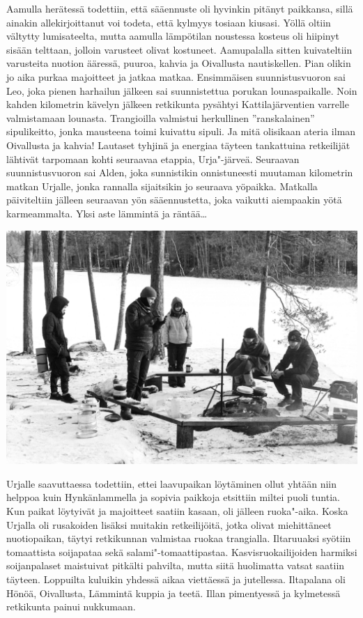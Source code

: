 \begin{multicols}{2}
Aamulla herätessä todettiin, että sääennuste oli hyvinkin pitänyt paikkansa,
sillä ainakin allekirjoittanut voi todeta, että kylmyys tosiaan kiusasi. Yöllä
oltiin vältytty lumisateelta, mutta aamulla lämpötilan noustessa kosteus oli
hiipinyt sisään telttaan, jolloin varusteet olivat kostuneet. Aamupalalla
sitten kuivateltiin varusteita nuotion ääressä, puuroa, kahvia ja Oivallusta
nautiskellen. Pian olikin jo aika purkaa majoitteet ja jatkaa matkaa.
Ensimmäisen suunnistusvuoron sai Leo, joka pienen harhailun jälkeen sai
suunnistettua porukan lounaspaikalle. Noin kahden kilometrin kävelyn jälkeen
retkikunta pysähtyi Kattilajärventien varrelle valmistamaan lounasta.
Trangioilla valmistui herkullinen ''ranskalainen'' sipulikeitto, jonka mausteena
toimi kuivattu sipuli. Ja mitä olisikaan ateria ilman Oivallusta ja kahvia!
Lautaset tyhjinä ja energiaa täyteen tankattuina retkeilijät lähtivät tarpomaan
kohti seuraavaa etappia, Urja"-järveä. Seuraavan suunnistusvuoron sai Alden,
joka sunnistikin onnistuneesti muutaman kilometrin matkan Urjalle, jonka
rannalla sijaitsikin jo seuraava yöpaikka. Matkalla päiviteltiin jälleen
seuraavan yön sääennustetta, joka vaikutti aiempaakin yötä karmeammalta. Yksi
aste lämmintä ja räntää…

\bigskip
\noindent\includegraphics[width=1.0\linewidth,trim={0 0 0 0},clip]{assets/minihaikki6}
\smallskip

Urjalle saavuttaessa todettiin, ettei laavupaikan löytäminen ollut yhtään niin
helppoa kuin Hynkänlammella ja sopivia paikkoja etsittiin miltei puoli tuntia.
Kun paikat löytyivät ja majoitteet saatiin kasaan, oli jälleen ruoka"-aika.
Koska Urjalla oli rusakoiden lisäksi muitakin retkeilijöitä, jotka olivat
miehittäneet nuotiopaikan, täytyi retkikunnan valmistaa ruokaa trangialla.
Iltaruuaksi syötiin tomaattista soijapataa sekä salami"-tomaattipastaa.
Kasvisruokailijoiden harmiksi soijanpalaset maistuivat pitkälti pahvilta, mutta
siitä huolimatta vatsat saatiin täyteen. Loppuilta kuluikin yhdessä aikaa
viettäessä ja jutellessa. Iltapalana oli Hönöä, Oivallusta, Lämmintä kuppia ja
teetä. Illan pimentyessä ja kylmetessä retkikunta painui nukkumaan.


\end{multicols}
